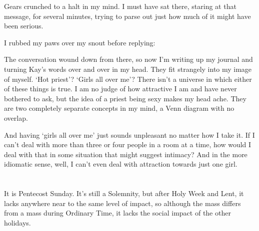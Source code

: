 





Gears crunched to a halt in my mind. I must have sat there, staring at that message, for several minutes, trying to parse out just how much of it might have been serious.


I rubbed my paws over my snout before replying:



The conversation wound down from there, so now I'm writing up my journal and turning Kay's words over and over in my head. They fit strangely into my image of myself. `Hot priest'? `Girls all over me'? There isn't a universe in which either of these things is true. I am no judge of how attractive I am and have never bothered to ask, but the idea of a priest being sexy makes my head ache. They are two completely separate concepts in my mind, a Venn diagram with no overlap.

And having `girls all over me' just sounds unpleasant no matter how I take it. If I can't deal with more than three or four people in a room at a time, how would I deal with that in some situation that might suggest intimacy? And in the more idiomatic sense, well, I can't even deal with attraction towards just one girl.

\section{}

It is Pentecost Sunday. It's still a Solemnity, but after Holy Week and Lent, it lacks anywhere near to the same level of impact, so although the mass differs from a mass during Ordinary Time, it lacks the social impact of the other holidays.

